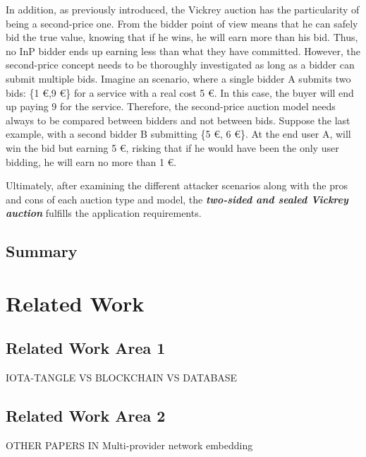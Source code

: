 In addition, as previously introduced, the Vickrey auction has the particularity of being a second-price one. From the bidder point of view means that he can safely bid the true value, knowing that if he wins, he will earn more than his bid. Thus, no InP bidder ends up earning less than what they have committed. However, the second-price concept needs to be thoroughly investigated as long as a bidder can submit multiple bids. Imagine an scenario, where a single bidder A submits two bids: \{1 \euro,9 \euro\} for a service with a real cost 5 \euro. In this case, the buyer will end up paying 9 for the service. Therefore, the second-price auction model needs always to be compared between bidders and not between bids. Suppose the last example, with a second bidder B submitting \{5 \euro, 6 \euro\}. At the end user A, will win the bid but earning 5 \euro, risking that if he would have been the only user bidding, he will earn no more than 1 \euro.

Ultimately, after examining the different attacker scenarios along with the pros and cons of each auction type and model, the \textbf{\textit{two-sided and sealed Vickrey auction}} fulfills the application requirements.  


\section{Summary}


\chapter{Related Work}
\label{ch:relatedwork}
\section{Related Work Area 1}

IOTA-TANGLE VS BLOCKCHAIN VS DATABASE

\section{Related Work Area 2}

OTHER PAPERS IN Multi-provider network embedding
